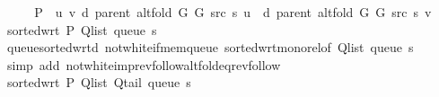 \begin{isabellebody}
%
\isadelimproof
%
\endisadelimproof
%
\isatagproof
{}\isamarkupfalse%
\ {\isacharminus}{\kern0pt}\isanewline
\ \ \isamarkupfalse%
\ {\isacharquery}{\kern0pt}P\ {\isacharequal}{\kern0pt}\ {\isachardoublequoteopen}{\isasymlambda}u\ v{\isachardot}{\kern0pt}\ d\ {\isacharparenleft}{\kern0pt}parent\ {\isacharparenleft}{\kern0pt}alt{\isacharunderscore}{\kern0pt}fold\ G{}\ G{}\ src\ s{\isacharparenright}{\kern0pt}{\isacharparenright}{\kern0pt}\ u\ {\isasymle}\ d\ {\isacharparenleft}{\kern0pt}parent\ {\isacharparenleft}{\kern0pt}alt{\isacharunderscore}{\kern0pt}fold\ G{}\ G{}\ src\ s{\isacharparenright}{\kern0pt}{\isacharparenright}{\kern0pt}\ v{\isachardoublequoteclose}\isanewline
\ \ \isamarkupfalse%
\ {\isachardoublequoteopen}sorted{\isacharunderscore}{\kern0pt}wrt\ {\isacharquery}{\kern0pt}P\ {\isacharparenleft}{\kern0pt}Q{\isacharunderscore}{\kern0pt}list\ {\isacharparenleft}{\kern0pt}queue\ s{\isacharparenright}{\kern0pt}{\isacharparenright}{\kern0pt}{\isachardoublequoteclose}\isanewline
\ \ \ \ \isamarkupfalse%
\ queue{\isacharunderscore}{\kern0pt}sorted{\isacharunderscore}{\kern0pt}wrt{\isacharunderscore}{\kern0pt}d\ not{\isacharunderscore}{\kern0pt}white{\isacharunderscore}{\kern0pt}if{\isacharunderscore}{\kern0pt}mem{\isacharunderscore}{\kern0pt}queue\ sorted{\isacharunderscore}{\kern0pt}wrt{\isacharunderscore}{\kern0pt}mono{\isacharunderscore}{\kern0pt}rel{\isacharbrackleft}{\kern0pt}of\ {\isachardoublequoteopen}{\isacharparenleft}{\kern0pt}Q{\isacharunderscore}{\kern0pt}list\ {\isacharparenleft}{\kern0pt}queue\ s{\isacharparenright}{\kern0pt}{\isacharparenright}{\kern0pt}{\isachardoublequoteclose}{\isacharbrackright}{\kern0pt}\isanewline
\ \ \ \ \isamarkupfalse%
\ {\isacharparenleft}{\kern0pt}simp\ add{\isacharcolon}{\kern0pt}\ not{\isacharunderscore}{\kern0pt}white{\isacharunderscore}{\kern0pt}imp{\isacharunderscore}{\kern0pt}rev{\isacharunderscore}{\kern0pt}follow{\isacharunderscore}{\kern0pt}alt{\isacharunderscore}{\kern0pt}fold{\isacharunderscore}{\kern0pt}eq{\isacharunderscore}{\kern0pt}rev{\isacharunderscore}{\kern0pt}follow{\isacharparenright}{\kern0pt}\isanewline
\ \ \isamarkupfalse%
\ {\isachardoublequoteopen}sorted{\isacharunderscore}{\kern0pt}wrt\ {\isacharquery}{\kern0pt}P\ {\isacharparenleft}{\kern0pt}Q{\isacharunderscore}{\kern0pt}list\ {\isacharparenleft}{\kern0pt}Q{\isacharunderscore}{\kern0pt}tail\ {\isacharparenleft}{\kern0pt}queue\ s{\isacharparenright}{\kern0pt}{\isacharparenright}{\kern0pt}{\isacharparenright}{\kern0pt}{\isachardoublequoteclose}\isanewline

\end{isabellebody}
